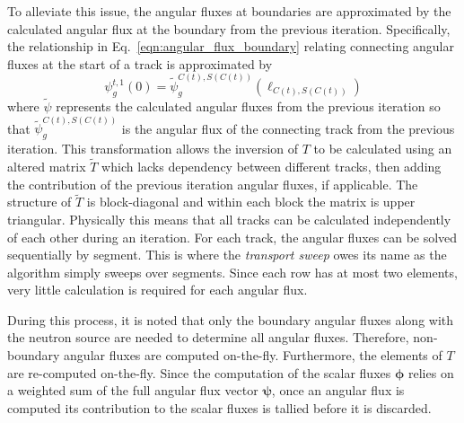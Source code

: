 To alleviate this issue, the angular fluxes at boundaries are approximated by the calculated angular flux at the boundary from the previous iteration. Specifically, the relationship in Eq.~\ref{eqn:angular_flux_boundary} relating connecting angular fluxes at the start of a track is approximated by
\begin{dmath}
	\psi_g^{t,1}(0) = \widetilde{\psi}_g^{C(t),S(C(t))}(\ell_{C(t),S(C(t))})
\end{dmath}
where $\widetilde{\psi}$ represents the calculated angular fluxes from the previous iteration so that $\widetilde{\psi}_g^{C(t),S(C(t))}$ is the angular flux of the connecting track from the previous iteration. This transformation allows the inversion of $T$ to be calculated using an altered matrix $\tilde{T}$ which lacks dependency between different tracks, then adding the contribution of the previous iteration angular fluxes, if applicable. The structure of $\tilde{T}$ is block-diagonal and within each block the matrix is upper triangular. Physically this means that all tracks can be calculated independently of each other during an iteration. For each track, the angular fluxes can be solved sequentially by segment. This is where the \textit{transport sweep} owes its name as the algorithm simply sweeps over segments. Since each row has at most two elements, very little calculation is required for each angular flux. 

During this process, it is noted that only the boundary angular fluxes along with the neutron source are needed to determine all angular fluxes. Therefore, non-boundary angular fluxes are computed on-the-fly. Furthermore, the elements of $T$ are re-computed on-the-fly. Since the computation of the scalar fluxes $\boldsymbol{\phi}$ relies on a weighted sum of the full angular flux vector $\boldsymbol{\psi}$, once an angular flux is computed its contribution to the scalar fluxes is tallied before it is discarded.

